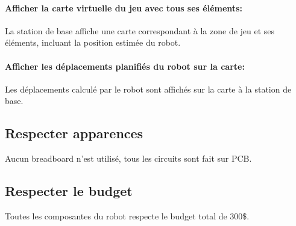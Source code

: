 \paragraph{Afficher la carte virtuelle du jeu avec tous ses éléments:}
La station de base affiche une carte correspondant à la zone de jeu et ses éléments, incluant la position estimée du robot.

\paragraph{Afficher les déplacements planifiés du robot sur la carte:}
Les déplacements calculé par le robot sont affichés sur la carte à la station de base.

\subsection{Respecter apparences}
Aucun breadboard n'est utilisé, tous les circuits sont fait sur PCB.

\subsection{Respecter le budget}
Toutes les composantes du robot respecte le budget total de 300\$.
